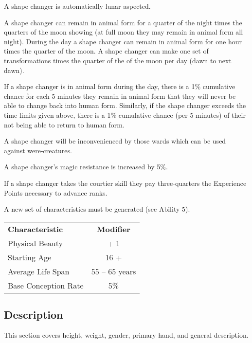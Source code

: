 \begin{multicols*}{3}
\begin{Enumerate}
\item
A shape changer is automatically lunar aspected.

\item
A shape changer can remain in animal form for a quarter of the night
times the quarters of the moon showing (\ie at full moon they may
remain in animal form all night). During the day a shape changer can
remain in animal form for one hour times the quarter of the moon. A
shape changer can make one set of transformations times the quarter of
the of the moon per day (\ie dawn to next dawn).

\item
If a shape changer is in animal form during the day, there is a 1\%
cumulative chance for each 5 minutes they remain in animal form that
they will never be able to change back into human form. Similarly, if
the shape changer exceeds the time limits given above, there is a 1\%
cumulative chance (per 5 minutes) of their not being able to return to
human form.

\item
A shape changer will be inconvenienced by those wards which can be
used against were-creatures.

\item
A shape changer's magic resistance is increased by 5\%.

\item
If a shape changer takes the courtier skill they pay three-quarters
the Experience Points necessary to advance ranks.
\end{Enumerate}

A new set of characteristics must be generated (see Ability 5).

\begin{tabularx}{\linewidth}{Xc}
\textbf{Characteristic} & \textbf{Modifier} \\
Physical Beauty		& + 1 \\
Starting Age		& 16 + \\
Average Life Span	& 55 -- 65 years \\
Base Conception Rate	& 5\% \\
\end{tabularx}

\subsection{Description}

This section covers height, weight, gender, primary hand, and general
description.


\end{multicols*}
